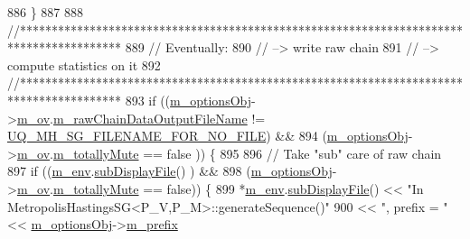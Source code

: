 \begin{DoxyCode}
886   \}
887 
888   \textcolor{comment}{//****************************************************************************************}
889   \textcolor{comment}{// Eventually:}
890   \textcolor{comment}{// --> write raw chain}
891   \textcolor{comment}{// --> compute statistics on it}
892   \textcolor{comment}{//****************************************************************************************}
893   \textcolor{keywordflow}{if} ((\hyperlink{class_q_u_e_s_o_1_1_metropolis_hastings_s_g_a5d0bc9f73d50d272aa6bfb5ef5939ef3}{m\_optionsObj}->\hyperlink{class_q_u_e_s_o_1_1_metropolis_hastings_s_g_options_a9d4792d9fc2dc5439b8ab489b0c236eb}{m\_ov}.\hyperlink{class_q_u_e_s_o_1_1_mh_options_values_a0ff310cdab62e1bdbff8663f8a6b1c77}{m\_rawChainDataOutputFileName} != 
      \hyperlink{_metropolis_hastings_s_g_options_8h_a75699ceb938d800e2b7f59ede3ea9a31}{UQ\_MH\_SG\_FILENAME\_FOR\_NO\_FILE}) &&
894       (\hyperlink{class_q_u_e_s_o_1_1_metropolis_hastings_s_g_a5d0bc9f73d50d272aa6bfb5ef5939ef3}{m\_optionsObj}->\hyperlink{class_q_u_e_s_o_1_1_metropolis_hastings_s_g_options_a9d4792d9fc2dc5439b8ab489b0c236eb}{m\_ov}.\hyperlink{class_q_u_e_s_o_1_1_mh_options_values_af812309e81191e88dfdc87c5815141a3}{m\_totallyMute} == \textcolor{keyword}{false}                              
               )) \{
895 
896     \textcolor{comment}{// Take "sub" care of raw chain}
897     \textcolor{keywordflow}{if} ((\hyperlink{class_q_u_e_s_o_1_1_metropolis_hastings_s_g_ac8ea061e55b920e0c8f9bce5c3f20e52}{m\_env}.\hyperlink{class_q_u_e_s_o_1_1_base_environment_a8a0064746ae8dddfece4229b9ad374d6}{subDisplayFile}()                   ) &&
898         (\hyperlink{class_q_u_e_s_o_1_1_metropolis_hastings_s_g_a5d0bc9f73d50d272aa6bfb5ef5939ef3}{m\_optionsObj}->\hyperlink{class_q_u_e_s_o_1_1_metropolis_hastings_s_g_options_a9d4792d9fc2dc5439b8ab489b0c236eb}{m\_ov}.\hyperlink{class_q_u_e_s_o_1_1_mh_options_values_af812309e81191e88dfdc87c5815141a3}{m\_totallyMute} == \textcolor{keyword}{false})) \{
899       *\hyperlink{class_q_u_e_s_o_1_1_metropolis_hastings_s_g_ac8ea061e55b920e0c8f9bce5c3f20e52}{m\_env}.\hyperlink{class_q_u_e_s_o_1_1_base_environment_a8a0064746ae8dddfece4229b9ad374d6}{subDisplayFile}() << \textcolor{stringliteral}{"In MetropolisHastingsSG<P\_V,P\_M>::generateSequence()"}
900                               << \textcolor{stringliteral}{", prefix = "}                                         << 
      \hyperlink{class_q_u_e_s_o_1_1_metropolis_hastings_s_g_a5d0bc9f73d50d272aa6bfb5ef5939ef3}{m\_optionsObj}->\hyperlink{class_q_u_e_s_o_1_1_metropolis_hastings_s_g_options_a4f7c510aaa530336d24259e2a89f5d0b}{m\_prefix}

\end{DoxyCode}
